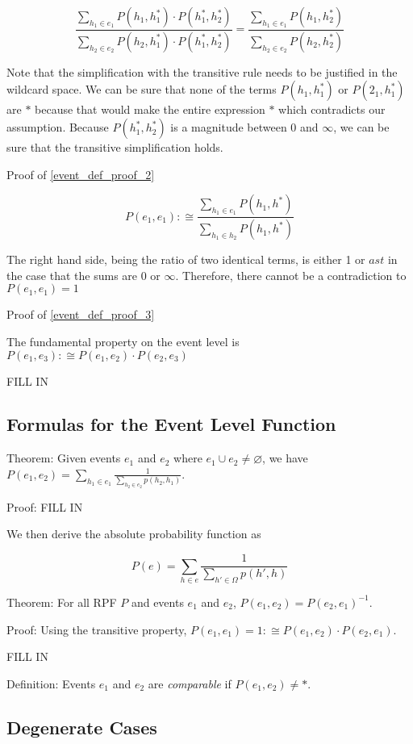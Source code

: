 \documentclass[twoside]{article}
\begin{document}
\[\frac{\sum_{h_1 \in e_1} P(h_1, h_1^*) \cdot P(h_1^*, h_2^*)}{\sum_{h_2 \in e_2} P(h_2, h_1^*) \cdot P(h_1^*, h_2^*)} = \frac{\sum_{h_1 \in e_1} P(h_1, h_2^*)}{\sum_{h_2 \in e_2} P(h_2, h_2^*)}\]

Note that the simplification with the transitive rule needs to be justified in the wildcard space. We can be sure that none of the terms \(P(h_1, h_1^*)\) or \( P(2_1, h_1^*)\) are \(\ast\) because that would make the entire expression \(\ast\) which contradicts our assumption. Because \(P(h_1^*, h_2^*)\) is a magnitude between 0 and \(\infty\), we can be sure that the transitive simplification holds.

Proof of \ref{event_def_proof_2}

\[P(e_1, e_1) :\cong \frac{\sum_{h_1 \in e_1} P(h_1, h^*)}{\sum_{h_1 \in h_2} P(h_1, h^*)}\]

The right hand side, being the ratio of two identical terms, is either 1 or \(ast\) in the case that the sums are \(0\) or \(\infty\). Therefore, there cannot be a contradiction to \(P(e_1, e_1) = 1\)

Proof of \ref{event_def_proof_3}

The fundamental property on the event level is \(P(e_1, e_3) :\cong P(e_1, e_2) \cdot P(e_2, e_3)\)

FILL IN

\subsection{Formulas for the Event Level Function}

Theorem: Given events \(e_1\) and \(e_2\) where \(e_1 \cup e_2 \neq \varnothing\), we have \(P(e_1, e_2) = \sum_{h_1 \in e_1} \frac{1}{\sum_{h_2 \in e_2} p(h_2, h_1)}\).

Proof: FILL IN

We then derive the absolute probability function as

\[P(e) = \sum_{h \in e} \frac{1}{\sum_{h' \in \Omega}p(h', h)}\]

Theorem: For all RPF \(P\) and events \(e_1\) and \(e_2\), \(P(e_1, e_2) = P(e_2, e_1)^{-1}\).

Proof: Using the transitive property, \(P(e_1, e_1) = 1 :\cong P(e_1, e_2) \cdot P(e_2, e_1)\).

FILL IN

Definition: Events \(e_1\) and \(e_2\) are \textit{comparable} if \(P(e_1, e_2) \neq \ast\).

\subsection{Degenerate Cases}
\end{document}
